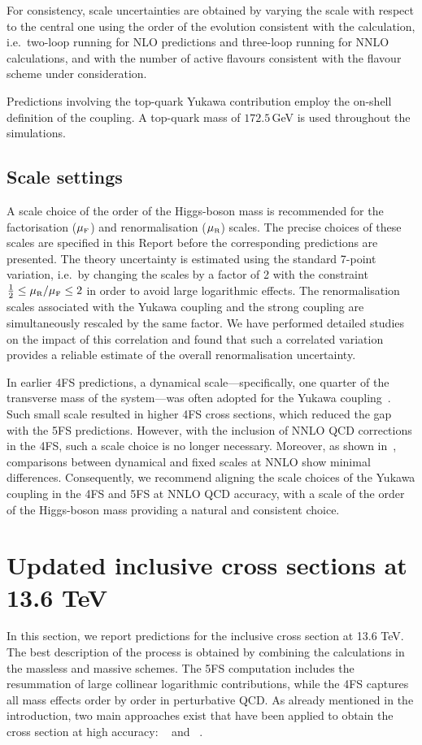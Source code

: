 \documentclass[11pt,a4paper]{article}
\begin{document}
For consistency, scale uncertainties are obtained by varying the scale with respect to the central one using the order of the evolution consistent with the 
calculation, i.e.\ two-loop running for NLO predictions and three-loop running for NNLO calculations, and with the number of active flavours consistent with the flavour scheme under consideration.

Predictions involving the top-quark Yukawa contribution employ the on-shell definition of the coupling. A top-quark mass of $172.5$\,GeV is used throughout the simulations.

\subsection{Scale settings}
A scale choice of the order of the Higgs-boson mass is recommended for the factorisation ($\muF$) and renormalisation ($\muR$) scales. The precise choices of these scales are specified in this Report before the corresponding predictions are presented. The theory uncertainty is estimated using the standard 7-point variation, i.e.\ by changing the scales by a factor of 2 with the constraint $\frac{1}{2}\leq\muR/\muF\leq 2$ in order to avoid large logarithmic effects. The renormalisation scales associated with the Yukawa coupling and the strong coupling are simultaneously rescaled by the same factor. We have performed detailed studies on the impact of this correlation and found that such a correlated variation provides a reliable estimate of the overall renormalisation uncertainty.

In earlier 4FS predictions, a dynamical scale—specifically, one quarter of the transverse mass of the \bbH{} system—was often adopted for the Yukawa coupling~\cite{Wiesemann:2014ioa}. Such small scale
resulted in higher 4FS cross sections, which reduced the gap with the 5FS predictions. However, with the inclusion of NNLO QCD corrections in the 4FS, 
such a scale choice is no longer necessary. Moreover, as shown in~, comparisons between dynamical and fixed scales at NNLO 
show minimal differences. Consequently, we recommend aligning the scale choices of the Yukawa coupling in the 4FS and 5FS at NNLO QCD accuracy, with a scale of the order of the Higgs-boson 
mass providing a natural and consistent choice.

\section{Updated inclusive cross sections at 13.6 TeV}
\label{sec:matchedinclusivenumbers}
In this section, we report predictions for the inclusive \bbH{}  cross section at 13.6 TeV. 
The best description of the \bbH{} process is obtained by combining the calculations in the massless and massive schemes. The 5FS computation includes 
the resummation of large collinear logarithmic contributions, while the 4FS captures all mass effects order by order in perturbative QCD. 
As already mentioned in the introduction, two main approaches exist that have been applied to obtain the \bbH{} cross section at 
high accuracy: \fonll{}~\cite{forte:2015hba,forte:2016sja,Duhr:2020kzd} and \nlonnllpart{}~\cite{Bonvini:2015pxa,Bonvini:2016fgf}. 
\end{document}
